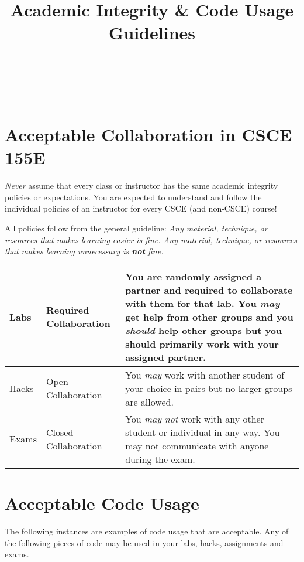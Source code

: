 \documentclass[12pt]{scrartcl}
\title{Academic Integrity \& Code Usage Guidelines}\let\Title\@title
\subtitle{Computer Science I\\
{\small
\vskip.5cm
Department of Computer Science \& Engineering \\
University of Nebraska--Lincoln}
\vskip-1cm}
\date{~}
\begin{document}
\maketitle
\vskip-1.5cm
\hrule

\section*{Acceptable Collaboration in CSCE 155E}

\emph{Never} assume that every class or instructor has the same academic
integrity policies or expectations.  You are expected to understand and
follow the individual policies of an instructor for every CSCE (and non-CSCE)
course!

All policies follow from the general guideline:  \emph{Any material, technique,
or resources that makes learning easier is fine.  Any material, technique,
or resources that makes learning unnecessary is \textbf{not} fine.}

\begin{center}
\begin{tabular}{|l|l|p{8cm}|}
\hline
Labs & Required Collaboration & You are randomly assigned a partner and required to collaborate with them for that lab.  You \emph{may} get help from other groups and
you \emph{should} help other groups but you should primarily work with your assigned partner. \\
\hline
Hacks & Open Collaboration & You \emph{may} work with another student
of your choice in pairs but no larger groups are allowed.\\
\hline
Exams & Closed Collaboration & You \emph{may not} work with any other student or individual in any way.  You may not communicate with anyone during the exam.\\
\hline
\end{tabular}
\end{center}

\section*{Acceptable Code Usage}

The following instances are examples of code usage that are acceptable.
Any of the following pieces of code may be used in your labs, hacks, assignments
and exams.
\end{document}
